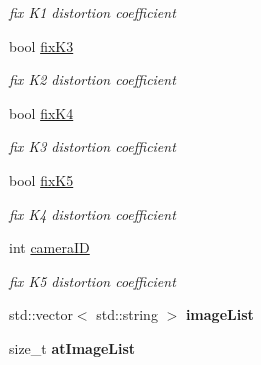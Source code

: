 \begin{DoxyCompactItemize}
\begin{DoxyCompactList}\small\item\em fix K1 distortion coefficient \end{DoxyCompactList}\item 
\mbox{\label{class_settings_a433fca3c377d42f1c7d43e35a286913f}} 
bool \mbox{\hyperlink{class_settings_a433fca3c377d42f1c7d43e35a286913f}{fix\+K3}}
\begin{DoxyCompactList}\small\item\em fix K2 distortion coefficient \end{DoxyCompactList}\item 
\mbox{\label{class_settings_ac993998a56cebe0593cb74fe39858d31}} 
bool \mbox{\hyperlink{class_settings_ac993998a56cebe0593cb74fe39858d31}{fix\+K4}}
\begin{DoxyCompactList}\small\item\em fix K3 distortion coefficient \end{DoxyCompactList}\item 
\mbox{\label{class_settings_a4d0d37eef5f3033a8aabc3f09ee29a03}} 
bool \mbox{\hyperlink{class_settings_a4d0d37eef5f3033a8aabc3f09ee29a03}{fix\+K5}}
\begin{DoxyCompactList}\small\item\em fix K4 distortion coefficient \end{DoxyCompactList}\item 
\mbox{\label{class_settings_af32a5ff06192bde106c934e0361bcd7e}} 
int \mbox{\hyperlink{class_settings_af32a5ff06192bde106c934e0361bcd7e}{camera\+ID}}
\begin{DoxyCompactList}\small\item\em fix K5 distortion coefficient \end{DoxyCompactList}\item 
\mbox{\label{class_settings_ab3f8f916639b93c3b5079facfe395078}} 
std\+::vector$<$ std\+::string $>$ {\bfseries image\+List}
\item 
\mbox{\label{class_settings_a1b89e85a2638e19f2d53269245d19b66}} 
size\+\_\+t {\bfseries at\+Image\+List}
\item 
\mbox{\label{class_settings_abd5706146b34d3c32aef4025dcd2ec1b}} 

\end{DoxyCompactItemize}
